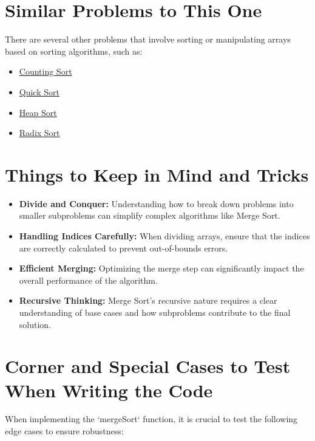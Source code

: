 \section*{Similar Problems to This One}
There are several other problems that involve sorting or manipulating arrays based on sorting algorithms, such as:
\begin{itemize}
    \item \hyperref[problem:counting_sort]{Counting Sort}
    \item \hyperref[problem:quick_sort]{Quick Sort}
    \item \hyperref[problem:heap_sort]{Heap Sort}
    \item \hyperref[problem:radix_sort]{Radix Sort}
\end{itemize}

\section*{Things to Keep in Mind and Tricks}
\begin{itemize}
    \item \textbf{Divide and Conquer:} Understanding how to break down problems into smaller subproblems can simplify complex algorithms like Merge Sort.
    
    \item \textbf{Handling Indices Carefully:} When dividing arrays, ensure that the indices are correctly calculated to prevent out-of-bounds errors.
    
    \item \textbf{Efficient Merging:} Optimizing the merge step can significantly impact the overall performance of the algorithm.
    
    \item \textbf{Recursive Thinking:} Merge Sort's recursive nature requires a clear understanding of base cases and how subproblems contribute to the final solution.
\end{itemize}

\section*{Corner and Special Cases to Test When Writing the Code}
When implementing the `mergeSort` function, it is crucial to test the following edge cases to ensure robustness:

